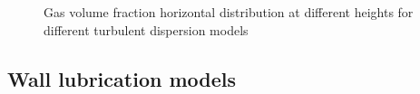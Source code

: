 \documentclass[11pt,a4paper]{article}
\begin{document}
\begin{figure}[H]
    \centering
    \caption[]{Gas volume fraction horizontal distribution at different heights for different turbulent dispersion models}
    \label{fig:alpha_turbdisp}
\end{figure}

\subsection{Wall lubrication models}
\label{sub:wall_lubrication_models}
\end{document}
